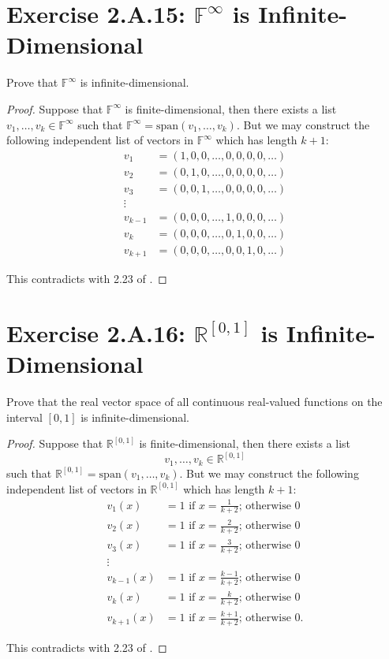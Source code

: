 \section{Exercise 2.A.15: $\mathbb{F}^\infty$ is Infinite-Dimensional}
Prove that $\mathbb{F}^\infty$ is infinite-dimensional.
\begin{proof}
Suppose that $\mathbb{F}^\infty$ is finite-dimensional, then there exists a list $v_1,\dots,v_k\in\mathbb{F}^\infty$ such that $\mathbb{F}^\infty=\text{span}(v_1,\dots,v_k)$. But we may construct the following independent list of vectors in $\mathbb{F}^\infty$ which has length $k+1$:
\begin{equation*}
\begin{split}
v_1&=(1, 0, 0, \dots, 0, 0, 0, 0, \dots)\\
v_2&=(0, 1, 0, \dots, 0, 0, 0, 0, \dots)\\
v_3&=(0, 0, 1, \dots, 0, 0, 0, 0, \dots)\\
\vdots&\\
v_{k-1}&=(0, 0, 0, \dots, 1, 0, 0, 0, \dots)\\
v_k&=(0, 0, 0, \dots, 0, 1, 0, 0, \dots)\\
v_{k+1}&=(0, 0, 0, \dots, 0, 0, 1, 0, \dots)
\end{split}
\end{equation*}

This contradicts with 2.23 of \cite{axler2014linear}.
\end{proof}

\section{Exercise 2.A.16: $\mathbb{R}^{[0,1]}$ is Infinite-Dimensional}
Prove that the real vector space of all continuous real-valued functions
on the interval $[0,1]$ is infinite-dimensional.
\begin{proof}
Suppose that $\mathbb{R}^{[0,1]}$ is finite-dimensional, then there exists a list \[
v_1,\dots,v_k\in\mathbb{R}^{[0,1]}
\] such that $\mathbb{R}^{[0,1]}=\text{span}(v_1,\dots,v_k)$. But we may construct the following independent list of vectors in $\mathbb{R}^{[0,1]}$ which has length $k+1$:
\begin{equation*}
\begin{split}
v_1(x)&=1\text{ if }x=\frac{1}{k+2}\text{; otherwise }0\\
v_2(x)&=1\text{ if }x=\frac{2}{k+2}\text{; otherwise }0\\
v_3(x)&=1\text{ if }x=\frac{3}{k+2}\text{; otherwise }0\\
\vdots&\\
v_{k-1}(x)&=1\text{ if }x=\frac{k-1}{k+2}\text{; otherwise }0\\
v_k(x)&=1\text{ if }x=\frac{k}{k+2}\text{; otherwise }0\\
v_{k+1}(x)&=1\text{ if }x=\frac{k+1}{k+2}\text{; otherwise }0.
\end{split}
\end{equation*}

This contradicts with 2.23 of \cite{axler2014linear}.
\end{proof}

